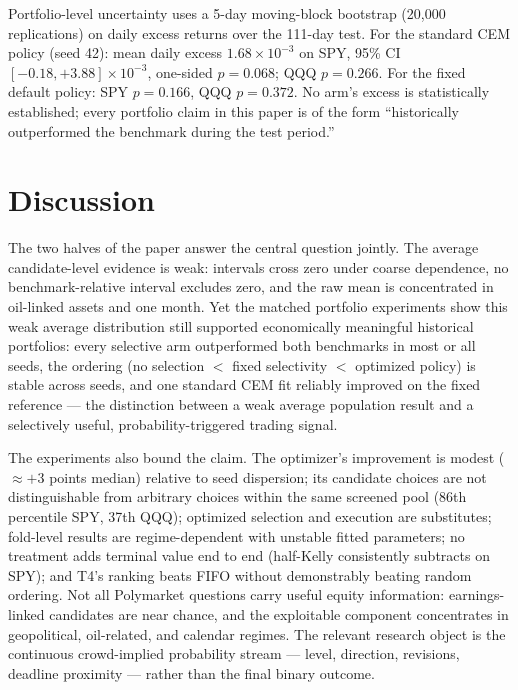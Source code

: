 \documentclass[sigconf,anonymous]{acmart}
\begin{document}
Portfolio-level uncertainty uses a 5-day moving-block bootstrap (20,000 replications) on daily excess returns over the 111-day test. For the standard CEM policy (seed 42): mean daily excess $1.68\times10^{-3}$ on SPY, 95\% CI $[-0.18,+3.88]\times10^{-3}$, one-sided $p=0.068$; QQQ $p=0.266$. For the fixed default policy: SPY $p=0.166$, QQQ $p=0.372$. No arm's excess is statistically established; every portfolio claim in this paper is of the form ``historically outperformed the benchmark during the test period.''

\section{Discussion}

The two halves of the paper answer the central question jointly. The average candidate-level evidence is weak: intervals cross zero under coarse dependence, no benchmark-relative interval excludes zero, and the raw mean is concentrated in oil-linked assets and one month. Yet the matched portfolio experiments show this weak average distribution still supported economically meaningful historical portfolios: every selective arm outperformed both benchmarks in most or all seeds, the ordering (no selection $<$ fixed selectivity $<$ optimized policy) is stable across seeds, and one standard CEM fit reliably improved on the fixed reference --- the distinction between a weak average population result and a selectively useful, probability-triggered trading signal.

The experiments also bound the claim. The optimizer's improvement is modest ($\approx+3$ points median) relative to seed dispersion; its candidate choices are not distinguishable from arbitrary choices within the same screened pool (86th percentile SPY, 37th QQQ); optimized selection and execution are substitutes; fold-level results are regime-dependent with unstable fitted parameters; no treatment adds terminal value end to end (half-Kelly consistently subtracts on SPY); and T4's ranking beats FIFO without demonstrably beating random ordering. Not all Polymarket questions carry useful equity information: earnings-linked candidates are near chance, and the exploitable component concentrates in geopolitical, oil-related, and calendar regimes. The relevant research object is the continuous crowd-implied probability stream --- level, direction, revisions, deadline proximity --- rather than the final binary outcome.
\end{document}
